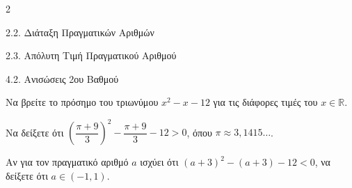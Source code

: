 \begin{ylh}{2}
    \item 2.2. Διάταξη Πραγματικών Αριθμών
    \item 2.3. Απόλυτη Τιμή Πραγματικού Αριθμού
    \item 4.2. Ανισώσεις 2ου Βαθμού
\end{ylh}

\begin{alist}
\item Να βρείτε το πρόσημο του τριωνύμου $x^2 - x - 12$ για τις διάφορες τιμές του $x \in \mathbb{R}$. 
\item Να δείξετε ότι $\left(\dfrac{\pi+9}{3}\right)^2 - \dfrac{\pi+9}{3} - 12 > 0$, όπου $\pi \approx 3,1415\dots$. 
\item Αν για τον πραγματικό αριθμό $a$ ισχύει ότι $(a+3)^2 - (a+3) - 12 < 0$, να δείξετε ότι $a \in (-1, 1)$. 
\end{alist}

